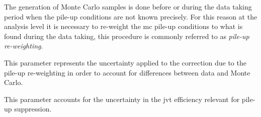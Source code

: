The generation of Monte Carlo samples is done before or during the data taking
period when the pile-up conditions are not known precisely. For this reason at
the analysis level it is necessary to re-weight the \gls{mc} pile-up conditions
to what is found during the data taking, this procedure is commonly referred to
as \emph{pile-up re-weighting}.
\begin{description}[font=\normalfont]
\item[syst\_PRW\_DATASF:] This parameter represents the uncertainty applied to
  the correction due to the pile-up re-weighting in order to account for
  differences between data and Monte Carlo.
\item[syst\_JvtEfficiency:] This parameter accounts for the uncertainty in the
  \gls{jvt} efficiency relevant for pile-up suppression.
\end{description}

